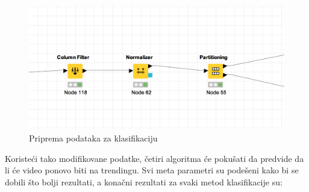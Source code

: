 \documentclass[a4paper]{article}
\theoremstyle{definition}
\begin{document}
\begin{figure}[H]
\begin{center}
    \includegraphics[width=1\textwidth]{before_classification.png}
    \caption{Priprema podataka za klasifikaciju}
\end{center}
\end{figure}

Koristeći tako modifikovane podatke, četiri algoritma će pokušati da predvide da li će video ponovo biti na trendingu. Svi meta parametri su podešeni kako bi se dobili što bolji rezultati, a konačni rezultati za svaki metod klasifikacije su:

\begingroup

\renewcommand\arraystretch{1.3}
\end{document}
